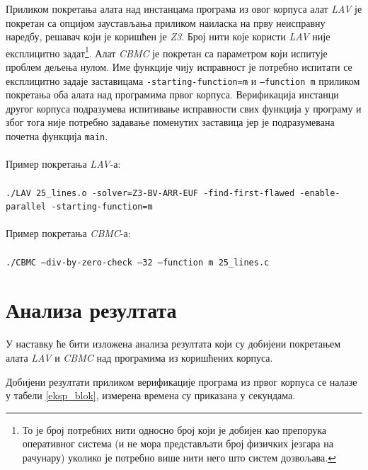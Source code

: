 \documentclass[12pt,oneside]{memoir}
\begin{document}
Приликом покретања алата над инстанцама програма из овог корпуса алат \textit{LAV} је покретан са опцијом заустављања приликом наиласка на прву неисправну наредбу, решавач који је коришћен је \textit{Z3}. Број нити које користи \textit{LAV} није експлицитно задат\footnote{То је број потребних нити односно број који је добијен као препорука оперативног система (и не мора представљати број физичких језгара на рачунару) уколико је потребно више нити него што систем дозвољава.}. Алат \textit{CBMC} је покретан са параметром који испитује проблем дељења нулом. Име функције чију исправност је потребно испитати се експлицитно задаје заставицама \texttt{-starting-function=m} и \texttt{--function m} приликом покретања оба алата над програмима првог корпуса. Верификација инстанци другог корпуса подразумева испитивање исправности свих функција у програму и због тога није потребно задавање поменутих заставица јер је подразумевана почетна функција \texttt{main}.
\\ \\
Пример покретања \textit{LAV}-а:
\\ \\
\texttt{./LAV 25\_lines.o -solver=Z3-BV-ARR-EUF -find-first-flawed -enable-parallel -starting-function=m}
\\ \\
Пример покретања \textit{CBMC}-а:
\\ \\
\texttt{./CBMC --div-by-zero-check --32 --function m 25\_lines.c}


  
 \section{Анализа резултата}

	У наставку ће бити изложена анализа резултата који су добијени покретањем алата \textit{LAV} и \textit{CBMC} над програмима из коришћених корпуса. 	
	
  Добијени резултати приликом верификације програма из првог корпуса се налазе у табели \ref{eksp_blok}, измерена времена су приказана у секундама. 
  
\end{document}
